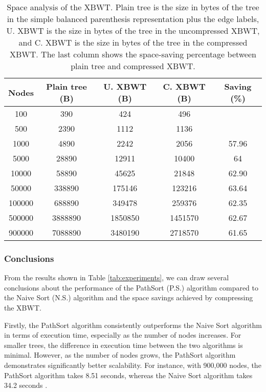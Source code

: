 \begin{table}[ht]
    \centering
    \begin{tabular}{|c|c|c|c|c|}
        \hline
        \textbf{Nodes} & \textbf{Plain tree (B)} & \textbf{U. XBWT (B)} & \textbf{C. XBWT (B)} & \textbf{Saving (\%)} \\
        \hline
        100 & 390 & 424 & 496 \color{gray}{(-27.18\%)} &  \\
        500 & 2390 & 1112 & 1136 \color{gray}{(52.47\%)} &  \\
        1000 & 4890 & 2242 & 2056 & 57.96 \\
        5000 & 28890 & 12911 & 10400 & 64 \\
        10000 & 58890 & 45625 & 21848 & 62.90 \\
        50000 & 338890 & 175146 & 123216 & 63.64 \\
        100000 & 688890 & 349478 & 259376 & 62.35 \\
        500000 & 3888890 & 1850850 & 1451570 & 62.67 \\
        900000 & 7088890 & 3480190 & 2718570 & 61.65 \\
        \hline
    \end{tabular}
    \caption{Space analysis of the XBWT. Plain tree is the size in bytes of the tree in the simple balanced parenthesis representation plus the edge labels, U. XBWT is the size in bytes of the tree in the uncompressed XBWT, and C. XBWT is the size in bytes of the tree in the compressed XBWT. The last column shows the space-saving percentage between plain tree and compressed XBWT.}
    \label{tab:experiments_2}
\end{table}

\subsubsection{Conclusions}
From the results shown in Table \cref{tab:experiments}, we can draw several conclusions about the performance of the PathSort (P.S.) algorithm compared to the Naive Sort (N.S.) algorithm and the space savings achieved by compressing the XBWT.

Firstly, the PathSort algorithm consistently outperforms the Naive Sort algorithm in terms of execution time, especially as the number of nodes increases. For smaller trees, the difference in execution time between the two algorithms is minimal. However, as the number of nodes grows, the PathSort algorithm demonstrates significantly better scalability. For instance, with 900,000 nodes, the PathSort algorithm takes 8.51 seconds, whereas the Naive Sort algorithm takes 34.2 seconds .

